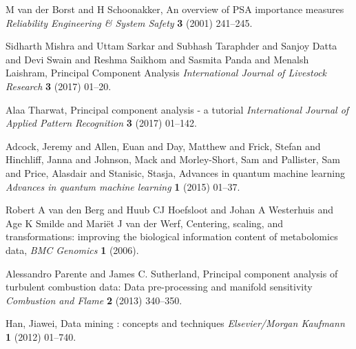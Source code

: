 \documentclass{ws-m3as}
\begin{document}
\begin{thebibliography}{0}
M van der Borst and H Schoonakker, An overview of {PSA} importance measures {\it Reliability Engineering {\&} System Safety} {\bf 3} (2001) 241--245.

Sidharth Mishra and Uttam Sarkar and Subhash Taraphder and Sanjoy Datta and Devi Swain and Reshma Saikhom and Sasmita Panda and Menalsh Laishram, Principal Component Analysis {\it International Journal of Livestock Research} {\bf 3} (2017) 01--20.

Alaa Tharwat, Principal component analysis - a tutorial {\it International Journal of Applied Pattern Recognition} {\bf 3} (2017) 01--142.

Adcock, Jeremy and Allen, Euan and Day, Matthew and Frick, Stefan and Hinchliff, Janna and Johnson, Mack and Morley-Short, Sam and Pallister, Sam and Price, Alasdair and Stanisic, Stasja, Advances in quantum machine learning {\it Advances in quantum machine learning} {\bf 1} (2015) 01--37.

Robert A van den Berg and Huub CJ Hoefsloot and Johan A Westerhuis and Age K Smilde and Mariët J van der Werf, Centering,  scaling,  and transformations: improving the biological information content of metabolomics data, {\it {BMC} Genomics} {\bf 1} (2006).

Alessandro Parente and James C. Sutherland, Principal component analysis of turbulent combustion data: Data pre-processing and manifold sensitivity {\it Combustion and Flame} {\bf 2} (2013) 340--350.

Han, Jiawei, Data mining : concepts and techniques {\it Elsevier/Morgan Kaufmann} {\bf 1} (2012) 01--740.

\end{thebibliography}
\end{document}
